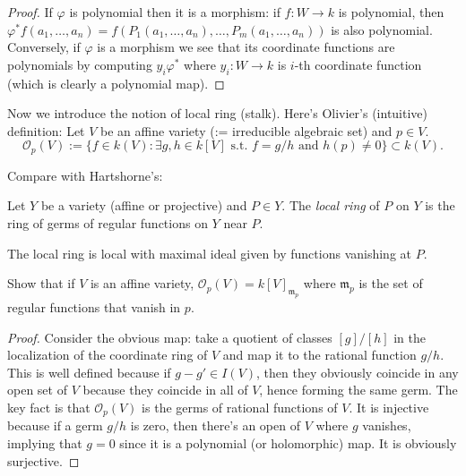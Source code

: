 \documentclass{book}
\begin{document}
\begin{proof}
If $\varphi$ is polynomial then it is a
morphism:
if $f:W \to k$ is polynomial,
then
$\varphi^*f(a_1,…,a_n)=f(P_1(a_1,…,a_n),…,
P_m(a_1,…,a_n))$
is also polynomial.
Conversely, if $\varphi$ is a morphism
we see that its coordinate functions are
polynomials
by computing $y_i\varphi^*$ where $y_i:W \to
k$
is $i$-th coordinate function (which is
clearly a polynomial map).
\end{proof}

\medskip\noindent
Now we introduce the notion of local ring
(stalk).
Here's Olivier's (intuitive) definition:
Let $V$ be an affine variety (:= irreducible
algebraic set)
and $p \in V$.
$$
\mathcal{O}_p(V)
:= \{f \in k(V):\exists g,h \in k[V]
\text{ s.t. }f=g/h \text{ and } h(p) \neq
0\}\subset k(V).
$$

Compare with Hartshorne's:

\begin{definition}
\label{definition-local-ring}
Let $Y$ be a variety (affine or projective)
and $P \in Y$.
The {\it local ring} of $P$ on $Y$ is
the ring of germs of regular functions on $Y$
near $P$.
\end{definition}

\begin{exercise}
\label{exercise-local-ring-is-local}
The local ring is local with maximal ideal
given by functions vanishing at $P$.
\end{exercise}


\begin{exercise}
\label{exercise-stalk-affine-varieties}
Show that if $V$ is an affine variety,
$\mathcal{O}_p(V) =
k[V]_{\mathfrak{m}_p}$
where $\mathfrak{m}_p$ is the set of regular
functions
that vanish in $p$.
\end{exercise}

\begin{proof}
Consider the obvious map: take a quotient of
classes
$[g]/[h]$ in the localization of the
coordinate ring of $V$
and map it to the rational function $g/h$.
This is well defined because if $g-g' \in
I(V)$,
then they obviously coincide in any open set
of $V$
because they coincide in all of $V$, hence
forming the same germ.
The key fact is that $\mathcal{O}_p(V)$ is
the germs of rational
functions of $V$.
It is injective because if a germ $g/h$ is
zero, then there's
an open of $V$ where $g$ vanishes, implying
that $g=0$
since it is a polynomial (or holomorphic)
map.
It is obviously surjective.
\end{proof}
\end{document}
